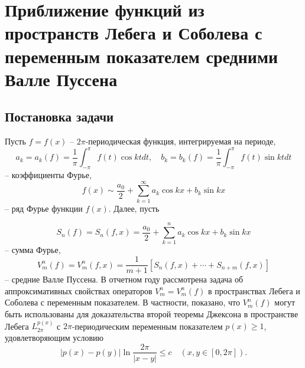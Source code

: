 \chapter{Приближение функций из пространств Лебега и Соболева с переменным показателем средними Валле Пуссена}





\section{ Постановка задачи}\label{vpmshiis1}

Пусть $f=f(x)$ -- $2\pi$-периодическая функция, интегрируемая на периоде,
\begin{equation}\label{vpmshii1.1}
    a_k=a_k(f)=\frac1\pi\int_{-\pi}^\pi f(t)\cos ktdt,\quad b_k=b_k(f)=\frac1\pi\int_{-\pi}^\pi f(t)\sin ktdt
\end{equation}
-- коэффициенты Фурье,
\begin{equation}\label{vpmshii1.2}
    f(x) \sim \frac{a_0}{2}+ \sum_{k=1}^\infty a_k\cos kx+b_k\sin kx
\end{equation}
-- ряд Фурье функции $f(x)$. Далее, пусть

\begin{equation} \label{vpmshii1.3}
 S_n(f)=   S_n(f,x)=\frac{a_0}{2}+ \sum_{k=1}^n a_k\cos kx+b_k\sin kx
\end{equation}
-- сумма Фурье,
\begin{equation}\label{vpmshii1.4}
 V_m^n(f)=V_m^n(f,x)=\frac1{m+1}[S_n(f,x)+\cdots+S_{n+m}(f,x)]
\end{equation}
-- средние Валле Пуссена. В отчетном году рассмотрена задача
об аппроксимативных свойствах операторов $V_m^n=V_m^n(f)$ в пространствах Лебега и Соболева с переменным показателем.
В частности, показано, что $V_m^n(f)$ могут быть использованы для доказательства второй теоремы Джексона в пространстве
Лебега $L_{2\pi}^{p(x)}$ с $2\pi$-периодическим переменным показателем  $p(x)\ge1$, удовлетворяющим условию
\begin{equation}\label{vpmshii1.5}
  |p(x)-p(y)|\ln\frac{2\pi}{|x-y|}\le c \quad (x,y\in [0,2\pi]).
  \end{equation}

